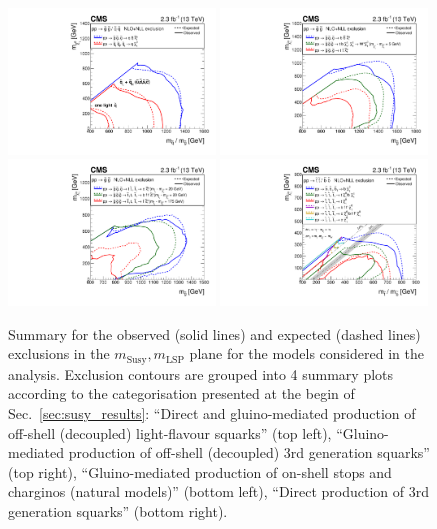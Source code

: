 \begin{figure}[thp!]
  \begin{center}
    \includegraphics[width=0.49\textwidth]{figures/susyResults/mixSUMMARY.pdf}
    \includegraphics[width=0.49\textwidth]{figures/susyResults/gluinoSUMMARY.pdf} \\
    \includegraphics[width=0.49\textwidth]{figures/susyResults/naturalSUMMARY.pdf}
    \includegraphics[width=0.49\textwidth]{figures/susyResults/allThirdGenSUMMARY.pdf} \\
    \caption{Summary for the observed (solid lines) and expected (dashed lines) exclusions in the $m_{\mathrm{Susy}},m_{\mathrm{LSP}}$ plane for the models considered in the analysis. 
       Exclusion contours are grouped into 4 summary plots according to the categorisation presented at the begin of Sec.~\ref{sec:susy_results}: 
       ``Direct and gluino-mediated production of off-shell (decoupled) light-flavour squarks'' (top left), ``Gluino-mediated production of off-shell (decoupled) 3rd generation squarks'' (top right), ``Gluino-mediated production of on-shell stops and charginos (natural models)'' (bottom left), ``Direct production of 3rd generation squarks'' (bottom right). 
      \label{fig:summary-excl-plots} }
  \end{center}
\end{figure}


